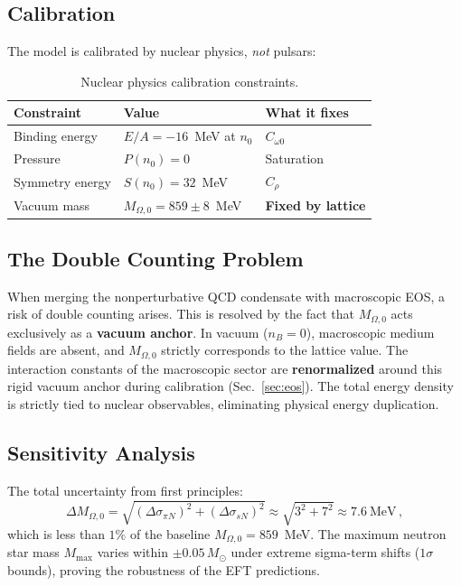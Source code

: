 \documentclass[11pt,a4paper]{article}
\begin{document}
\subsection{Calibration}

The model is calibrated by nuclear physics, \emph{not} pulsars:

\begin{table}[h]
\centering
\begin{tabular}{lll}
\toprule
Constraint & Value & What it fixes \\
\midrule
Binding energy & $E/A = -16$~MeV at $n_0$ & $C_{\omega 0}$ \\
Pressure & $P(n_0) = 0$ & Saturation \\
Symmetry energy & $S(n_0) = 32$~MeV & $C_\rho$ \\
Vacuum mass & $M_{\Omega,0} = 859 \pm 8$~MeV & \textbf{Fixed by lattice} \\
\bottomrule
\end{tabular}
\caption{Nuclear physics calibration constraints.}
\label{tab:calibration}
\end{table}

\subsection{The Double Counting Problem}

When merging the nonperturbative QCD condensate with macroscopic EOS, a risk of double counting arises. This is resolved by the fact that $M_{\Omega,0}$ acts exclusively as a \textbf{vacuum anchor}. In vacuum ($n_B = 0$), macroscopic medium fields are absent, and $M_{\Omega,0}$ strictly corresponds to the lattice value. The interaction constants of the macroscopic sector are \textbf{renormalized} around this rigid vacuum anchor during calibration (Sec.~\ref{sec:eos}). The total energy density is strictly tied to nuclear observables, eliminating physical energy duplication.

\subsection{Sensitivity Analysis}

The total uncertainty from first principles:
\begin{equation}
\Delta M_{\Omega,0} = \sqrt{(\Delta \sigma_{\pi N})^2 + (\Delta \sigma_{sN})^2} \approx \sqrt{3^2 + 7^2} \approx 7.6~\text{MeV}\,,
\end{equation}
which is less than $1\%$ of the baseline $M_{\Omega,0} = 859$~MeV. The maximum neutron star mass $M_{\max}$ varies within $\pm 0.05\,M_\odot$ under extreme sigma-term shifts ($1\sigma$ bounds), proving the robustness of the EFT predictions.
\end{document}
